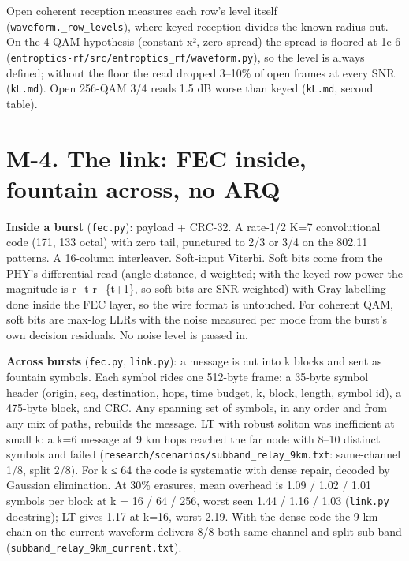 \documentclass[10pt,letterpaper,twocolumn]{article}
\begin{document}
Open coherent reception measures each row's level itself (\texttt{waveform.\allowbreak{}\_\allowbreak{}row\_\allowbreak{}levels}), where keyed reception divides the known radius out. On the 4-QAM hypothesis (constant \textbar x\textbar², zero spread) the spread is floored at 1e-6 (\texttt{entroptics-{}\allowbreak{}rf/\allowbreak{}src/\allowbreak{}entroptics\_\allowbreak{}rf/\allowbreak{}waveform.\allowbreak{}py}), so the level is always defined; without the floor the read dropped 3--10\% of open frames at every SNR (\texttt{kL.\allowbreak{}md}). Open 256-QAM 3/4 reads 1.5 dB worse than keyed (\texttt{kL.\allowbreak{}md}, second table).

\section{M-4. The link: FEC inside, fountain across, no ARQ}\label{m-4-the-link-fec-inside-fountain-across-no-arq}

\textbf{Inside a burst} (\texttt{fec.\allowbreak{}py}): payload + CRC-32. A rate-1/2 K=7 convolutional code (171, 133 octal) with zero tail, punctured to 2/3 or 3/4 on the 802.11 patterns. A 16-column interleaver. Soft-input Viterbi. Soft bits come from the PHY's differential read (angle distance, \textbar d\textbar-weighted; with the keyed row power the magnitude is r\_t r\_\{t+1\}, so soft bits are SNR-weighted) with Gray labelling done inside the FEC layer, so the wire format is untouched. For coherent QAM, soft bits are max-log LLRs with the noise measured per mode from the burst's own decision residuals. No noise level is passed in.

\textbf{Across bursts} (\texttt{fec.\allowbreak{}py}, \texttt{link.\allowbreak{}py}): a message is cut into k blocks and sent as fountain symbols. Each symbol rides one 512-byte frame: a 35-byte symbol header (origin, seq, destination, hops, time budget, k, block, length, symbol id), a 475-byte block, and CRC. Any spanning set of symbols, in any order and from any mix of paths, rebuilds the message. LT with robust soliton was inefficient at small k: a k=6 message at 9 km hops reached the far node with 8--10 distinct symbols and failed (\texttt{research/\allowbreak{}scenarios/\allowbreak{}subband\_\allowbreak{}relay\_\allowbreak{}9km.\allowbreak{}txt}: same-channel 1/8, split 2/8). For k ≤ 64 the code is systematic with dense repair, decoded by Gaussian elimination. At 30\% erasures, mean overhead is 1.09 / 1.02 / 1.01 symbols per block at k = 16 / 64 / 256, worst seen 1.44 / 1.16 / 1.03 (\texttt{link.\allowbreak{}py} docstring); LT gives 1.17 at k=16, worst 2.19. With the dense code the 9 km chain on the current waveform delivers 8/8 both same-channel and split sub-band (\texttt{subband\_\allowbreak{}relay\_\allowbreak{}9km\_\allowbreak{}current.\allowbreak{}txt}).
\end{document}
